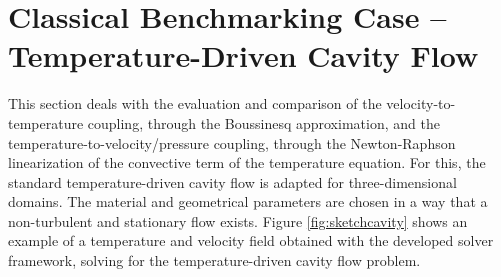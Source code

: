 \section{Classical Benchmarking Case -- Temperature-Driven Cavity Flow}
\label{sec:cavity}

This section deals with the evaluation and comparison of the velocity-to-temperature coupling, through the Boussinesq approximation, and the temperature-to-velocity/pressure coupling, through the Newton-Raphson linearization of the convective term of the temperature equation. For this, the standard temperature-driven cavity flow \cite{christon02,vahl83} is adapted for three-dimensional domains. The material and geometrical parameters are chosen in a way that a non-turbulent and stationary flow exists. Figure \ref{fig:sketchcavity} shows an example of a temperature and velocity field obtained with the developed solver framework, solving for the temperature-driven cavity flow problem.

